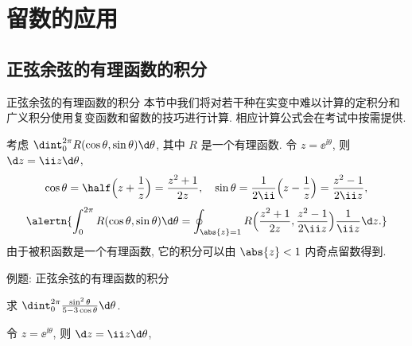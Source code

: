 \section{留数的应用}

\subsection{正弦余弦的有理函数的积分}

\begin{frame}{正弦余弦的有理函数的积分}
	\onslide<+->
	本节中我们将对若干种在实变中难以计算的定积分和广义积分使用复变函数和留数的技巧进行计算.
	\onslide<+->
	相应计算公式会在考试中按需提供.

	\onslide<+->
	考虑 $\dint_0^{2\pi} R(\cos\theta,\sin\theta)\d\theta$, 其中 $R$ 是一个有理函数.
	\onslide<+->
	令 $z=\ee^{\ii\theta}$, 则 $\d z=\ii z\d\theta$,
	\onslide<+->
	\[
		\cos\theta=\half\Bigl(z+\frac1z\Bigr)=\frac{z^2+1}{2z},\quad
		\sin\theta=\frac1{2\ii}\Bigl(z-\frac1z\Bigr)=\frac{z^2-1}{2\ii z},
	\]
	\onslide<+->
	\[
		\alertn{\int_0^{2\pi} R(\cos\theta,\sin\theta)\d\theta=\oint_{\abs{z}=1}R\Bigl(\frac{z^2+1}{2z},\frac{z^2-1}{2\ii z}\Bigr)\frac1{\ii z}\d z.}
	\]
	\onslide<+->
	由于被积函数是一个有理函数, 它的积分可以由 $\abs{z}<1$ 内奇点留数得到.
\end{frame}


\begin{frame}{例题: 正弦余弦的有理函数的积分}\small
	\beqskip{1pt}
	\onslide<+->
	\begin{example}[nearnext]
		求 $\dint_0^{2\pi}\frac{\sin^2\theta}{5-3\cos\theta}\d\theta$.
	\end{example}
	\onslide<+->
	\begin{solution}[nearprev]
		令 $z=\ee^{\ii\theta}$, 则 $\d z=\ii z\d\theta$,
		\onslide<+->{%
			\[
				\cos\theta=\half\Bigl(z+\frac1z\Bigr)=\frac{z^2+1}{2z},\qquad
				\sin\theta=\frac1{2\ii}\Bigl(z-\frac1z\Bigr)=\frac{z^2-1}{2\ii z},
			\]
		}\onslide<+->{%
			\[
				\int_0^{2\pi}\frac{\sin^2\theta}{5-3\cos\theta}\d\theta
				=\oint_{\abs{z}=1}\frac{(z^2-1)^2}{-4z^2}\cdot\frac1{5-3\dfrac{z^2+1}{2z}}\cdot\frac{\d z}{\ii z}
				=-\frac \ii6\oint_{\abs{z}=1}\frac{(z^2-1)^2}{z^2(z-3)(z-\dfrac13)}\d z.
			\]
		}\onslide<+->{%
			则
			$\Res[f(z),0]=\dfrac{10}3, \Res[f(z),\dfrac13]=-\dfrac83$,
		}
		\meddel
	\end{solution}
	\endgroup
\end{frame}

